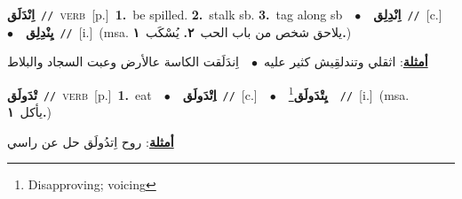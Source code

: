\documentclass[10pt,a4paper,twoside]{article} %
\begin{document}
\begin{multicols}{2}
{\setlength\topsep{0pt}\textbf{\foreignlanguage{arabic}{اِنْدَلَق}}\ {\color{gray}\texttt{//}\color{black}}\ \textsc{verb}\ [p.]\ \textbf{1.}~be spilled.  \textbf{2.}~stalk sb.  \textbf{3.}~tag along sb\ \ $\bullet$\ \ \setlength\topsep{0pt}\textbf{\foreignlanguage{arabic}{اِنْدِلِق}}\ {\color{gray}\texttt{//}\color{black}}\ [c.]\ \ $\bullet$\ \ \setlength\topsep{0pt}\textbf{\foreignlanguage{arabic}{يِنْدِلِق}}\ {\color{gray}\texttt{//}\color{black}}\ [i.]\ \color{gray}(msa. \foreignlanguage{arabic}{يلاحق شخص من باب الحب}~\foreignlanguage{arabic}{\textbf{٢.}}  \foreignlanguage{arabic}{يُسْكَب}~\foreignlanguage{arabic}{\textbf{١.}})\color{black}\  \begin{flushright}\color{gray}\foreignlanguage{arabic}{\textbf{\underline{\foreignlanguage{arabic}{أمثلة}}}: اثقلي وتندلقِيش كثير عليه\ $\bullet$\ \  اِندَلَقت الكاسة عالأرض وعبت السجاد والبلاط}\end{flushright}\color{black}} \vspace{2mm}

{\setlength\topsep{0pt}\textbf{\foreignlanguage{arabic}{تْدَولَق}}\ {\color{gray}\texttt{//}\color{black}}\ \textsc{verb}\ [p.]\ \textbf{1.}~eat\ \ $\bullet$\ \ \setlength\topsep{0pt}\textbf{\foreignlanguage{arabic}{اِتْدَولَق}}\ {\color{gray}\texttt{//}\color{black}}\ [c.]\ \ $\bullet$\ \ \setlength\topsep{0pt}\textbf{\foreignlanguage{arabic}{يِتْدَولَق}}\footnote{Disapproving; voicing}\ \ {\color{gray}\texttt{//}\color{black}}\ [i.]\ \color{gray}(msa. \foreignlanguage{arabic}{يأكل}~\foreignlanguage{arabic}{\textbf{١.}})\color{black}\  \begin{flushright}\color{gray}\foreignlanguage{arabic}{\textbf{\underline{\foreignlanguage{arabic}{أمثلة}}}: روح اِتدُولَق حل عن راسي}\end{flushright}\color{black}} \vspace{2mm}


\end{multicols}
\end{document}
